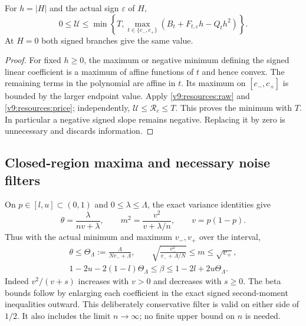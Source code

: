\begin{proposition}\label{v9:resources:cell}
For $h=|H|$ and the actual sign $\varepsilon$ of $H$,
\begin{equation}\label{v9:resources:envelope}
 0\le\mathcal U\le
 \min\left\{T,\max_{t\in\{c_-,c_+\}}
                 (B_t+F_{t,\varepsilon}h-Q_th^2)\right\}.
\end{equation}
At $H=0$ both signed branches give the same value.
\end{proposition}
\begin{proof}
For fixed $h\ge0$, the maximum or negative minimum defining the signed
linear coefficient is a maximum of affine functions of $t$ and hence
convex. The remaining terms in the polynomial are affine in $t$.
Its maximum on $[c_-,c_+]$ is bounded by the larger endpoint value.
Apply \eqref{v9:resources:raw} and \eqref{v9:resources:price}; independently,
$\mathcal U\le\mathcal R_c\le T$. This proves the minimum with $T$.
In particular a negative signed slope remains negative. Replacing it by
zero is unnecessary and discards information.
\end{proof}

\subsection{Closed-region maxima and necessary noise filters}
\label{v9:resources:regions}
On $p\in[l,u]\subset(0,1)$ and $0\le\lambda\le\Lambda$, the exact
variance identities give
\[
 \theta=\frac{\lambda}{nv+\lambda},\qquad
 m^2=\frac{v^2}{v+\lambda/n},\qquad v=p(1-p).
\]
Thus with the actual minimum and maximum $v_-,v_+$ over the interval,
\begin{equation}\label{v9:resources:noise-filter}
\begin{gathered}
 \theta\le\Theta_\Lambda:=\frac{\Lambda}{Nv_-+\Lambda},\qquad
 \sqrt{\frac{v_-^2}{v_-+\Lambda/N}}\le m\le\sqrt{v_+},\\
 1-2u-2(1-l)\Theta_\Lambda\le\beta
       \le1-2l+2u\Theta_\Lambda.
\end{gathered}
\end{equation}
Indeed $v^2/(v+s)$ increases with $v>0$ and decreases with $s\ge0$.
The beta bounds follow by enlarging each coefficient in the exact signed
second-moment inequalities outward. This deliberately conservative filter
is valid on either side of $1/2$. It also includes the limit $n\to\infty$;
no finite upper bound on $n$ is needed.

